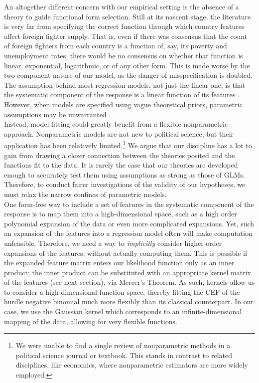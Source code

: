 \documentclass[12pt]{article}
\begin{document}
An altogether different concern with our empirical setting is the absence of a theory to guide functional form selection. Still at its nascent stage, the literature is very far from specifying the correct function through which country features affect foreign fighter supply. That is, even if there was consensus that the count of foreign fighters from each country is a function of, say, its poverty and unemployment rates, there would be no consensus on whether that function is linear, exponential, logarithmic, or of any other form. This is made worse by the two-component nature of our model, as the danger of misspecification is doubled. The assumption behind most regression models, not just the linear one, is that the systematic component of the response is a linear function of its features \cite{King1989a}. However, when models are specified using vague theoretical priors, parametric assumptions may be unwarranted \citep{Ho2007}. 	\\

Instead, model-fitting could greatly benefit from a flexible nonparametric approach. Nonparametric models are not new to political science, but their application has been relatively limited.\footnote{We were unable to find a single review of nonparametric methods in a political science journal or textbook. This stands in contrast to related disciplines, like economics, where nonparametric estimators are more widely employed.} We argue that our discipline has a lot to gain from drawing a closer connection between the theories posited and the functions fit to the data. It is rarely the case that our theories are developed enough to accurately test them using assumptions as strong as those of GLMs. Therefore, to conduct fairer investigations of the validity of our hypotheses, we must relax the narrow confines of parametric models. 		\\

One form-free way to include a set of features in the systematic component of the response is to map them into a high-dimensional space, such as a high order polynomial expansion of the data or even more complicated expansions. Yet, such an expansion of the features into a regression model often will make computation unfeasible. Therefore, we need a way to \textit{implicitly} consider higher-order expansions of the features, without actually computing them. This is possible if the expanded feature matrix enters our likelihood function only as an inner product; the inner product can be substituted with an appropriate kernel matrix of the features (see next section), via Mercer's Theorem. As such, kernels allow us to consider a high-dimensional function space, thereby fitting the CEF of the hurdle negative binomial much more flexibly than its classical counterpart. In our case, we use the Gaussian kernel which corresponds to an infinite-dimensional mapping of the data, allowing for very flexible functions. 	\\
\end{document}

